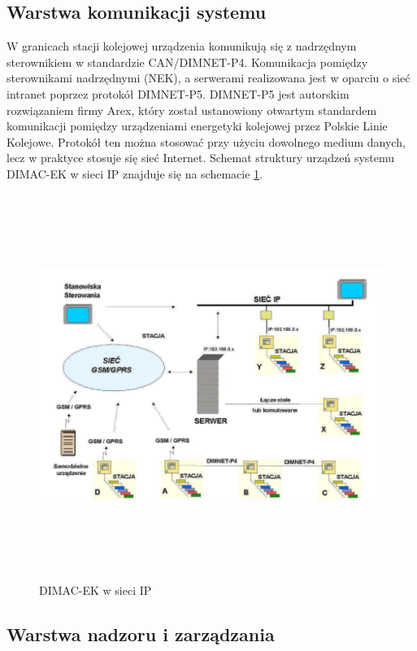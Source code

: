 \subsection{Warstwa komunikacji systemu}
W granicach stacji kolejowej urządzenia komunikują się z nadrzędnym sterownikiem w standardzie CAN/DIMNET-P4\cite{dimacek-wytyczne}.
Komunikacja pomiędzy sterownikami nadrzędnymi (NEK), a serwerami realizowana jest w oparciu o sieć intranet poprzez protokół \mbox{DIMNET-P5}. \mbox{DIMNET-P5} jest autorskim rozwiązaniem firmy Arex, który został ustanowiony otwartym standardem komunikacji pomiędzy urządzeniami energetyki kolejowej przez Polskie Linie Kolejowe. Protokół ten można stosować przy użyciu dowolnego medium danych, lecz w praktyce stosuje się sieć Internet. Schemat struktury urządzeń systemu DIMAC-EK w sieci IP znajduje się na schemacie \ref{fig:dimacek_ip}.


\begin{figure}[t]
	\centerline{\includegraphics[height=125mm]{./img/dimacek_ip.png}}
	\caption[DIMAC-EK w sieci IP]{DIMAC-EK w sieci IP \cite{arex-materials}}
	\label{fig:dimacek_ip}
\end{figure}


\subsection{Warstwa nadzoru i zarządzania}

